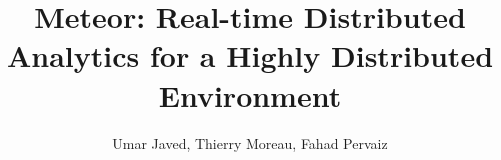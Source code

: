 \documentclass{article}
\begin{document}
\title{Meteor: Real-time Distributed Analytics for a Highly Distributed Environment
}
\author{Umar Javed, Thierry Moreau, Fahad Pervaiz}

\maketitle









\end{document}
